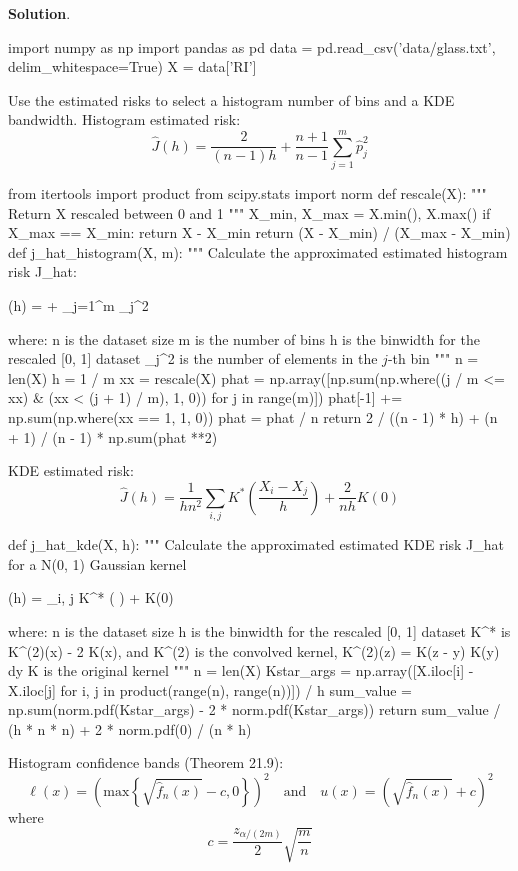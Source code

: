 \textbf{Solution}.

\begin{python}
import numpy as np
import pandas as pd
data = pd.read_csv('data/glass.txt', delim_whitespace=True)
X = data['RI']
\end{python}
Use the estimated risks to select a histogram number of bins and a
KDE bandwidth.
Histogram estimated risk:
\[
\hat{J}(h) = \frac{2}{(n - 1)h} + \frac{n+1}{n-1} \sum_{j=1}^m \hat{p}_{j}^{2}
\]

\begin{python}
from itertools import product
from scipy.stats import norm
def rescale(X):
    """
    Return X rescaled between 0 and 1
    """
    X_min, X_max = X.min(), X.max()
    if X_max == X_min:
        return X - X_min
    return (X - X_min) / (X_max - X_min)
def j_hat_histogram(X, m):
    """
    Calculate the approximated estimated histogram risk J_hat:
    
       (h) =  +  \sum_{j=1}^m _{j}^{2}
    
    where:
      n is the dataset size
      m is the number of bins
      h is the binwidth for the rescaled [0, 1] dataset
      _{j}^{2} is the number of elements in the $j$-th bin
    """
    n = len(X)
    h = 1 / m
    xx = rescale(X)
    phat = np.array([np.sum(np.where((j / m <= xx) & (xx < (j + 1) / m), 1, 0)) 
                                     for j in range(m)])
    phat[-1] += np.sum(np.where(xx == 1, 1, 0))
    phat = phat / n
    return 2 / ((n - 1) * h) + (n + 1) / (n - 1) * np.sum(phat **2)
\end{python}
KDE estimated risk:
\[
\hat{J}(h) = \frac{1}{hn^{2}}\sum_{i, j} K^{*} \left( \frac{X_{i} - X_{j}}{h} \right) + \frac{2}{nh} K(0)
\]

\begin{python}
def j_hat_kde(X, h):
    """
    Calculate the approximated estimated KDE risk J_hat for a N(0, 1) Gaussian kernel
    
      (h) =  \sum_{i, j} K^{*} 
          \left(  \right) +  K(0)
      
    where:
      n is the dataset size
      h is the binwidth for the rescaled [0, 1] dataset
      K^{*} is K^{(2)}(x) - 2 K(x), and K^{(2)} is the convolved kernel, 
          K^{(2)}(z) = \int K(z - y) K(y) dy
      K is the original kernel
    """
    n = len(X)
    Kstar_args = np.array([X.iloc[i] - X.iloc[j] for i, j in product(range(n), range(n))]) / h
    sum_value = np.sum(norm.pdf(Kstar_args) - 2 * norm.pdf(Kstar_args))
    return sum_value / (h * n * n) + 2 * norm.pdf(0) / (n * h)
\end{python}
Histogram confidence bands (Theorem 21.9):
\[
\ell(x) = \left( \text{max} \left\{\sqrt{\hat{f}_{n}(x)} - c, 0\right\} \right)^{2}
\quad \text{and} \quad
u(x) = \left(\sqrt{\hat{f}_{n}(x)} + c \right)^{2}
\]
where
\[
c = \frac{z_{\alpha / (2 m)}}{2} \sqrt{\frac{m}{n}}
\]

